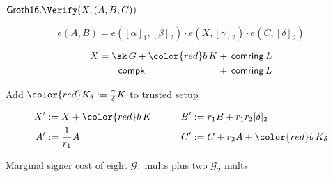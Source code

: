 \documentclass{beamer}
\def\comring{\ensuremath{\mathsf{comring}}\xspace}
\def\compk{\ensuremath{\mathsf{compk}}\xspace}
\begin{document}
\begin{frame}[t] %

$\mathsf{Groth16}.\Verify(X,(A,B,C))$

$$ e(A,B) = e([\alpha]_1, [\beta]_2) \cdot e(X, [\gamma]_2) \cdot e(C, [\delta]_2) $$

\smallskip

$$ \begin{alignedat}{2}
 X &= \sk \, G + {\color{red} b \, K} &&+ \, \comring \, L \\
   &= \, \, \, \, \compk  &&+ \, \comring \, L \\
\end{alignedat} $$

\bigskip

Add $\color{red} K_\delta := {\gamma\over\delta} K$ to trusted setup

$$ \begin{aligned}
X' &:= X + {\color{red} b\, K} &\quad&&
B' &:= r_1 B + r_1 r_2 [\delta]_2 \\
A' &:= {1 \over r_1} A & &&
C' &:= C + r_2 A + {\color{red} b\, K_\delta} \\
\end{aligned} $$

\bigskip\bigskip

\hspace{5pt} Marginal signer cost of eight $\mathcal{G}_1$ mults plus two $\mathcal{G}_2$ mults 


\end{frame}



\end{document}
